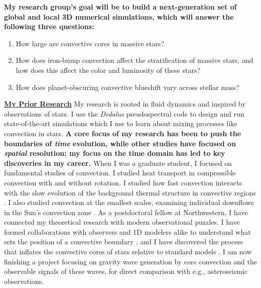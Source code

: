 \documentclass[12pt]{article}
\newcommand{\sct}[1]{\vspace{0.3cm}\hspace{-\parindent}\textbf{\underline{#1}}\hspace{0.3cm}}
\begin{document}
\textbf{My research group's goal will be to build a next-generation set of global and local 3D numerical simulations, which will answer the following three questions:}\vspace{-0.2cm}
\begin{enumerate}
    \item How large are convective cores in massive stars? \vspace{-0.2cm}
    \item How does iron-bump convection affect the stratification of massive stars, and how does this affect the color and luminosity of these stars?\vspace{-0.2cm}
    \item How does planet-obscuring convective blueshift vary across stellar mass?\vspace{-0.2cm}
\end{enumerate}

\sct{My Prior Research}
My research is rooted in fluid dynamics and inspired by observations of stars.
I use the \emph{Dedalus} \citep{burns_etal_2020} pseudospectral code to design and run state-of-the-art simulations which I use to learn about mixing processes like convection in stars.
\textbf{A core focus of my research has been to push the boundaries of \emph{time} evolution, while other studies have focused on \emph{spatial} resolution; my focus on the time domain has led to key discoveries in my career.}
When I was a graduate student, I focused on fundamental studies of convection.
I studied heat transport in compressible convection with  \citep{anders_etal_2019_rot} and without \citep{anders_brown_2017} rotation.
I studied how fast convection interacts with the slow evolution of the background thermal structure in convective regions \citep{anders_etal_2018,anders_etal_2020}.
I also studied convection at the smallest scales, examining individual downflows in the Sun's convection zone \cite{anders_etal_2019_thermals}.
As a postdoctoral fellow at Northwestern, I have connected my theoretical research with modern observational puzzles.
I have formed collaborations with observers and 1D modelers alike to understand what sets the position of a convective boundary \citep{anders_etal_2022b}, and I have discovered the process that inflates the convective cores of stars relative to standard models \citep{anders_etal_2022a}.
I am now finishing a project focusing on gravity wave generation by core convection and the observable signals of these waves, for direct comparison with e.g., asteroseismic observations.
\end{document}
